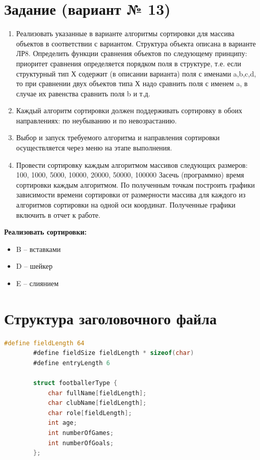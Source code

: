 \documentclass[12pt]{article}
\begin{document}
	\newpage
	
	
	\section{Задание (вариант № 13)}

	
	\begin{enumerate}
		\item Реализовать указанные в варианте алгоритмы сортировки для массива объектов в соответствии с вариантом. Структура объекта описана в варианте ЛР8. Определить функции сравнения объектов по следующему принципу: приоритет сравнения определяется порядком поля в структуре, т.е. если структурный тип Х содержит (в описании варианта) поля с именами a,b,c,d, то при сравнении двух объектов типа Х надо сравнить поля с именем a, в случае их равенства сравнить поля b и т.д.
		\item Каждый алгоритм сортировки должен поддерживать сортировку в обоих направлениях: по неубыванию и по невозрастанию.
		\item Выбор и запуск требуемого алгоритма и направления сортировки осуществляется через меню на этапе выполнения.
		\item Провести сортировку каждым алгоритмом массивов следующих размеров: 100, 1000, 5000, 10000, 20000, 50000, 100000 Засечь (программно) время сортировки каждым алгоритмом. По полученным точкам построить графики зависимости времени сортировки от размерности массива для каждого из алгоритмов сортировки на одной оси координат. Полученные графики включить в отчет к работе.
	\end{enumerate}
	
	\textbf{Реализовать сортировки:}
	\begin{itemize}
		\item B -- вставками
		\item D -- шейкер
		\item E -- слиянием
	\end{itemize}
	
	\newpage
	
	\section{Структура заголовочного файла}
	
	\begin{lstlisting}[language=C]
		#define fieldLength 64
		#define fieldSize fieldLength * sizeof(char)
		#define entryLength 6
		
		struct footballerType {
			char fullName[fieldLength];
			char clubName[fieldLength];
			char role[fieldLength];
			int age;
			int numberOfGames;
			int numberOfGoals;
		};
	\end{lstlisting}
	
\end{document}
